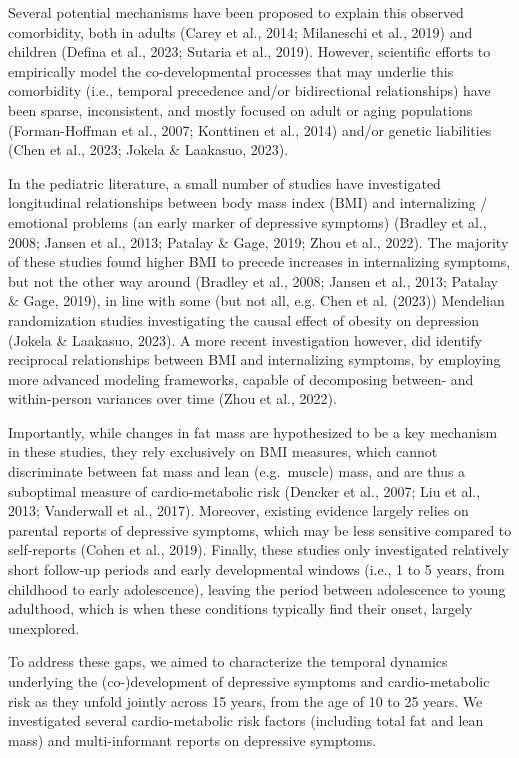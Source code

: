 \documentclass[
  letterpaper,
  DIV=11,
  numbers=noendperiod]{scrreport}
\begin{document}
Several potential mechanisms have been proposed to explain this observed
comorbidity, both in adults (Carey et al., 2014; Milaneschi et al.,
2019) and children (Defina et al., 2023; Sutaria et al., 2019). However,
scientific efforts to empirically model the co-developmental processes
that may underlie this comorbidity (i.e., temporal precedence and/or
bidirectional relationships) have been sparse, inconsistent, and mostly
focused on adult or aging populations (Forman-Hoffman et al., 2007;
Konttinen et al., 2014) and/or genetic liabilities (Chen et al., 2023;
Jokela \& Laakasuo, 2023).

In the pediatric literature, a small number of studies have investigated
longitudinal relationships between body mass index (BMI) and
internalizing / emotional problems (an early marker of depressive
symptoms) (Bradley et al., 2008; Jansen et al., 2013; Patalay \& Gage,
2019; Zhou et al., 2022). The majority of these studies found higher BMI
to precede increases in internalizing symptoms, but not the other way
around (Bradley et al., 2008; Jansen et al., 2013; Patalay \& Gage,
2019), in line with some (but not all, e.g. Chen et al. (2023))
Mendelian randomization studies investigating the causal effect of
obesity on depression (Jokela \& Laakasuo, 2023). A more recent
investigation however, did identify reciprocal relationships between BMI
and internalizing symptoms, by employing more advanced modeling
frameworks, capable of decomposing between- and within-person variances
over time (Zhou et al., 2022).

Importantly, while changes in fat mass are hypothesized to be a key
mechanism in these studies, they rely exclusively on BMI measures, which
cannot discriminate between fat mass and lean (e.g.~muscle) mass, and
are thus a suboptimal measure of cardio-metabolic risk (Dencker et al.,
2007; Liu et al., 2013; Vanderwall et al., 2017). Moreover, existing
evidence largely relies on parental reports of depressive symptoms,
which may be less sensitive compared to self-reports (Cohen et al.,
2019). Finally, these studies only investigated relatively short
follow-up periods and early developmental windows (i.e., 1 to 5 years,
from childhood to early adolescence), leaving the period between
adolescence to young adulthood, which is when these conditions typically
find their onset, largely unexplored.

To address these gaps, we aimed to characterize the temporal dynamics
underlying the (co-)development of depressive symptoms and
cardio-metabolic risk as they unfold jointly across 15 years, from the
age of 10 to 25 years. We investigated several cardio-metabolic risk
factors (including total fat and lean mass) and multi-informant reports
on depressive symptoms.
\end{document}
